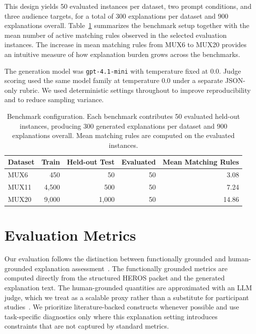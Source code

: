 \documentclass[sigconf,nonacm]{acmart}
\begin{document}
This design yields 50 evaluated instances per dataset, two prompt conditions, and three audience targets, for a total of 300 explanations per dataset and 900 explanations overall. Table~\ref{tab:benchmarks} summarizes the benchmark setup together with the mean number of active matching rules observed in the selected evaluation instances. The increase in mean matching rules from MUX6 to MUX20 provides an intuitive measure of how explanation burden grows across the benchmarks.

The generation model was \texttt{gpt-4.1-mini} with temperature fixed at 0.0. Judge scoring used the same model family at temperature 0.0 under a separate JSON-only rubric. We used deterministic settings throughout to improve reproducibility and to reduce sampling variance.

\begin{table}[t]
\caption{Benchmark configuration. Each benchmark contributes 50 evaluated held-out instances, producing 300 generated explanations per dataset and 900 explanations overall. Mean matching rules are computed on the evaluated instances.}
\label{tab:benchmarks}
\centering
\begin{tabular}{lrrrr}
\toprule
\textbf{Dataset} & \textbf{Train} & \textbf{Held-out Test} & \textbf{Evaluated} & \textbf{Mean Matching Rules} \\
\midrule
MUX6  & 450  & 50   & 50 & 3.08 \\
MUX11 & 4{,}500 & 500  & 50 & 7.24 \\
MUX20 & 9{,}000 & 1{,}000 & 50 & 14.86 \\
\bottomrule
\end{tabular}
\end{table}

\section{Evaluation Metrics}
Our evaluation follows the distinction between functionally grounded and human-grounded explanation assessment~\cite{doshivelez2017rigorous}. The functionally grounded metrics are computed directly from the structured HEROS packet and the generated explanation text. The human-grounded quantities are approximated with an LLM judge, which we treat as a scalable proxy rather than a substitute for participant studies~\cite{liu2023geval,huang2025judge}. We prioritize literature-backed constructs whenever possible and use task-specific diagnostics only where this explanation setting introduces constraints that are not captured by standard metrics.
\end{document}

